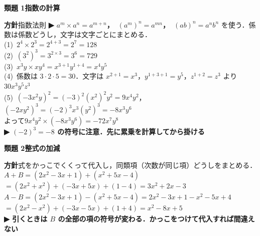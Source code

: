 \documentclass[a4paper,11pt]{ltjsarticle}
\newcommand{\ans}[2]{\Needspace{5\baselineskip}\vspace{6pt}%
  {\sffamily\bfseries 類題 #1\quad #2}\par}
\newcommand{\point}[1]{\textsf{\bfseries ▶ #1}}
\begin{document}
\ans{1}{指数の計算}
\begin{kai}
\textbf{方針}\quad 指数法則 \point{$a^m\times a^n=a^{m+n}$，\ $(a^m)^n=a^{mn}$，\ $(ab)^n=a^nb^n$} を使う．係数は係数どうし，文字は文字ごとにまとめる．\\[2pt]
(1)\ $2^4\times2^3=2^{4+3}=2^7=128$\\[2pt]
(2)\ $(3^2)^3=3^{2\times3}=3^6=729$\\[2pt]
(3)\ $x^3y\times xy^4=x^{3+1}y^{1+4}=x^4y^5$\\[2pt]
(4)\ 係数は $3\cdot2\cdot5=30$．文字は $x^{2+1}=x^3$，$y^{1+3+1}=y^5$，$z^{1+2}=z^3$ より\quad $30x^3y^5z^3$\\[2pt]
(5)\ $(-3x^2y)^2=(-3)^2(x^2)^2y^2=9x^4y^2$，\quad $(-2xy^2)^3=(-2)^3x^3(y^2)^3=-8x^3y^6$\\
\hspace*{1.5em}よって\quad $9x^4y^2\times(-8x^3y^6)=-72x^7y^8$\\
\point{$(-2)^3=-8$ の符号に注意．先に累乗を計算してから掛ける}
\end{kai}

\ans{2}{整式の加減}
\begin{kai}
\textbf{方針}\quad 式をかっこでくくって代入し，同類項（次数が同じ項）どうしをまとめる．\\[2pt]
$A+B=(2x^2-3x+1)+(x^2+5x-4)$\\
\hspace*{1.5em}$=(2x^2+x^2)+(-3x+5x)+(1-4)=3x^2+2x-3$\\[2pt]
$A-B=(2x^2-3x+1)-(x^2+5x-4)=2x^2-3x+1-x^2-5x+4$\\
\hspace*{1.5em}$=(2x^2-x^2)+(-3x-5x)+(1+4)=x^2-8x+5$\\
\point{引くときは $B$ の全部の項の符号が変わる．かっこをつけて代入すれば間違えない}
\end{kai}
\end{document}
